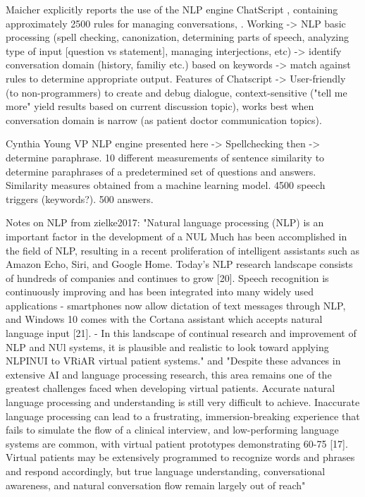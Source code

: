     
    
 Maicher \cite{maicher2017developing} explicitly reports the use of the NLP engine ChatScript , containing approximately 2500 rules for managing conversations, . Working -> NLP basic processing  (spell checking, canonization, determining
parts of speech, analyzing type of input [question vs statement],
managing interjections, etc) -> identify conversation domain (history, familiy etc.) based on keywords -> match against rules to determine appropriate output. Features of Chatscript -> User-friendly (to non-programmers) to create and debug dialogue, context-sensitive ("tell me more" yield results based on current discussion topic), works best when conversation domain is narrow (as patient doctor communication topics).

Cynthia Young VP \cite{foster2016using} NLP engine presented here \cite{mcclendon2014use}-> Spellchecking then -> determine paraphrase.  10 different measurements of sentence similarity to determine paraphrases of a predetermined set of questions and answers. Similarity measures obtained from a machine learning model. 4500 speech triggers (keywords?). 500 answers. 

Notes on NLP from zielke2017: "Natural language processing (NLP) is an important factor in
the development of a NUL Much has been accomplished in the
field of NLP, resulting in a recent proliferation of intelligent
assistants such as Amazon Echo, Siri, and Google Home.
Today's NLP research landscape consists of hundreds of
companies and continues to grow [20]. Speech recognition is
continuously improving and has been integrated into many
widely used applications - smartphones now allow dictation of
text messages through NLP, and Windows 10 comes with the
Cortana assistant which accepts natural language input [21]. - In
this landscape of continual research and improvement of NLP
and NUl systems, it is plausible and realistic to look toward
applying NLPINUI to VRiAR virtual patient systems." and "Despite these advances in extensive AI and language
processing research, this area remains one of the greatest
challenges faced when developing virtual patients. Accurate
natural language processing and understanding is still very
difficult to achieve. Inaccurate language processing can lead to
a frustrating, immersion-breaking experience that fails to
simulate the flow of a clinical interview, and low-performing
language systems are common, with virtual patient prototypes
demonstrating 60-75%
[17]. Virtual patients may be extensively programmed to
recognize words and phrases and respond accordingly, but true
language understanding, conversational awareness, and natural
conversation flow remain largely out of reach"

